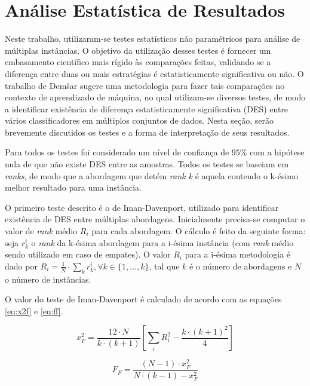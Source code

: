 \section{Análise Estatística de Resultados} \label{sec:analise-statistica}

Neste trabalho, utilizaram-se testes  estatísticos não paramétricos para análise
de múltiplas  instâncias. O objetivo da  utilização desses testes é  fornecer um
embasamento  científico  mais  rígido  às comparações  feitas,  validando  se  a
diferença entre  duas ou  mais estratégias  é estatisticamente  significativa ou
não. O  trabalho de  Dem\v{s}ar \cite{demsar:2006}  sugere uma  metodologia para
fazer  tais  comparações  no  contexto   de  aprendizado  de  máquina,  no  qual
utilizam-se  diversos testes,  de  modo a  identificar  existência de  diferença
estatisticamente significativa  (DES) entre vários classificadores  em múltiplos
conjuntos de dados. Nesta seção, serão brevemente discutidos os testes e a forma
de interpretação de seus resultados.

Para todos  os testes  foi considerado  um nível  de confiança  de $95\%$  com a
hipótese  nula de  que não  existe DES  entre as  amostras. Todos  os testes  se
baseiam em \textit{ranks},  de modo que a abordagem que  detém \textit{rank k} é
aquela contendo o k-ésimo melhor resultado para uma instância.

O  primeiro teste  descrito é  o de  Iman-Davenport, utilizado  para identificar
existência de DES entre múltiplas abordagens. Inicialmente precisa-se computar o
valor de  \textit{rank} médio $R_i$  para cada abordagem.  O cálculo é  feito da
seguinte forma: seja $r_k^i$ o \textit{rank} da k-ésima abordagem para a i-ésima
instância (com \textit{rank} médio sendo utilizado  em caso de empates). O valor
$R_i$ para  a i-ésima metodologia é  dado por $R_i =  \frac{1}{N} \cdot \sum_{k}
r_k^i, \forall k  \in \{1, \dots, k\}$, tal  que $k$ é o número  de abordagens e
$N$ o número de instâncias.

O  valor do  teste  de Iman-Davenport  é  calculado de  acordo  com as  equações
\eqref{eq:x2f} e \eqref{eq:ff}.

\begin{equation}
    x^2_F = \frac{12 \cdot N}{k \cdot (k + 1)} \left[ \sum_{i} R^2_{i} - \frac{k \cdot (k+1)^2}{4} \right] \label{eq:x2f}
\end{equation}

\begin{equation}
    F_F = \frac{(N - 1) \cdot x^2_F}{N \cdot (k - 1) - x^2_F} \label{eq:ff}
\end{equation}

